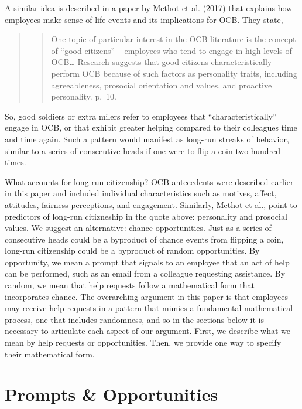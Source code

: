 \documentclass[english,,man]{apa6}
\theoremstyle{definition}
\theoremstyle{definition}
\theoremstyle{definition}
\theoremstyle{remark}
\begin{document}
A similar idea is described in a paper by Methot et al. (2017) that
explains how employees make sense of life events and its implications
for OCB. They state,

\begin{quote}
\begin{quote}
One topic of particular interest in the OCB literature is the concept of
\enquote{good citizens} -- employees who tend to engage in high levels
of OCB\ldots{} Research suggests that good citizens characteristically
perform OCB because of such factors as personality traits, including
agreeableness, prosocial orientation and values, and proactive
personality. p.~10.
\end{quote}
\end{quote}

So, good soldiers or extra milers refer to employees that
\enquote{characteristically} engage in OCB, or that exhibit greater
helping compared to their colleagues time and time again. Such a pattern
would manifest as long-run streaks of behavior, similar to a series of
consecutive heads if one were to flip a coin two hundred times.

What accounts for long-run citizenship? OCB antecedents were described
earlier in this paper and included individual characteristics such as
motives, affect, attitudes, fairness perceptions, and engagement.
Similarly, Methot et al., point to predictors of long-run citizneship in
the quote above: personality and prosocial values. We suggest an
alternative: chance opportunities. Just as a series of consecutive heads
could be a byproduct of chance events from flipping a coin, long-run
citizenship could be a byproduct of random opportunities. By
opportunity, we mean a prompt that signals to an employee that an act of
help can be performed, such as an email from a colleague requesting
assistance. By random, we mean that help requests follow a mathematical
form that incorporates chance. The overarching argument in this paper is
that employees may receive help requests in a pattern that mimics a
fundamental mathematical process, one that includes randomness, and so
in the sections below it is necessary to articulate each aspect of our
argument. First, we describe what we mean by help requests or
opportunities. Then, we provide one way to specify their mathematical
form.

\hypertarget{prompts-opportunities}{%
\section{Prompts \& Opportunities}\label{prompts-opportunities}}
\end{document}
